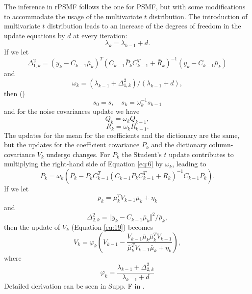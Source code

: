 \documentclass{mldsmsc}
\begin{document}
The inference in rPSMF follows the one for PSMF, but with some modifications to accommodate the usage of the multivariate $t$ distribution. The introduction of multivariate $t$ distribution leads to an increase of the degrees of freedom in the update equations by $d$ at every iteration:
\begin{equation}
    \lambda_k = \lambda_{k-1} + d.
\end{equation}
If we let 
\begin{equation}
    \Delta^2_{1,k} = (y_k - C_{k-1}\bar{\mu}_k)^T (C_{k-1} \bar{P}_k C_{k-1}^T + \bar{R}_k)^{-1} (y_k - C_{k-1}\bar{\mu}_k)
\end{equation}
and 
\begin{equation}
    \omega_k = (\lambda_{k-1} + \Delta^2_{1,k}) / (\lambda_{k-1} + d),
\end{equation}
then (\cite{akyildiz2021probabilistic})
\begin{equation}
    s_0 = s, \quad s_k = \omega_k^{-1} s_{k-1}
\end{equation}
and for the noise covariances update we have 
\begin{equation}
    Q_k = \omega_k Q_{k-1},
\end{equation}
\begin{equation}
    R_k = \omega_k R_{k-1}.
\end{equation}
The updates for the mean for the coefficients and the dictionary are the same, but the updates for the coefficient covariance $P_k$ and the dictionary column-covariance $V_k$ undergo changes. For $P_k$ the Student's $t$ update contributes to multiplying the right-hand side of Equation \ref{eq:6} by $\omega_k$, leading to
\begin{equation}
    P_k = \omega_k \left(\bar{P}_k - \bar{P}_k C_{k-1}^T \left(C_{k-1} \bar{P}_k C_{k-1}^T + \bar{R}_k\right)^{-1} C_{k-1} \bar{P}_k\right).
\end{equation}
If we let 
\begin{equation}
    \bar{\rho}_k = \bar{\mu}_k^T V_{k-1} \bar{\mu}_k + \eta_k
\end{equation}
and
\begin{equation}
    \Delta^2_{2,k} = \Vert y_k - C_{k-1}\bar{\mu}_k \Vert^2 / \bar{\rho}_k,
\end{equation}
then the update of $V_k$ (Equation \ref{eq:19}) becomes
\begin{equation}
    V_k = \varphi_k \left(V_{k-1} - \frac{V_{k-1} \bar{\mu}_k \bar{\mu}_k^T V_{k-1}}{\bar{\mu}_k^T V_{k-1} \bar{\mu}_k + \eta_k}\right),
\end{equation}
where 
\begin{equation}
    \varphi_k = \frac{\lambda_{k-1} + \Delta^2_{2,k}}{\lambda_{k-1} + d}
\end{equation}
Detailed derivation can be seen in Supp. F in \cite{akyildiz2021probabilistic}.
\end{document}

